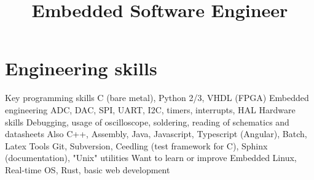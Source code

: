 \documentclass[11pt,a4paper,sans]{moderncv}        %
\title{Embedded Software Engineer}                               %
\begin{document}
\makecvtitle

\section{Engineering skills}
\cvitem
  {Key programming skills}
  {C (bare metal), Python 2/3, VHDL (FPGA)}
\cvitem
  {Embedded engineering}
  {ADC, DAC, SPI, UART, I2C, timers, interrupts, HAL}
\cvitem
  {Hardware skills}
  {Debugging, usage of oscilloscope, soldering, reading of schematics and datasheets}
\cvitem
  {Also}
  {C++, Assembly, Java, Javascript, Typescript (Angular), Batch, Latex}
\cvitem
  {Tools}
  {Git, Subversion, Ceedling (test framework for C), Sphinx (documentation), "Unix" utilities}
\cvitem
  {Want to learn or improve}
  {Embedded Linux, Real-time OS, Rust, basic web development}
\end{document}
